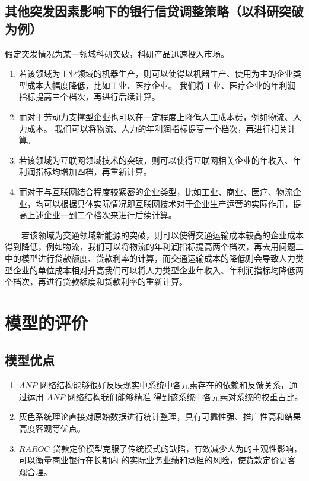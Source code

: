 \documentclass[withoutpreface,bwprint]{cumcmthesis}
\begin{document}
    \subsection{其他突发因素影响下的银行信贷调整策略（以科研突破为例）}
    假定突发情况为某一领域科研突破，科研产品迅速投入市场。
        \begin{enumerate}
            \item 若该领域为工业领域的机器生产，则可以使得以机器生产、使用为主的企业类型成本大幅度降低，比如工业、医疗企业。
                我们将工业、医疗企业的年利润指标提高三个档次，再进行后续计算。
            \item 而对于劳动力支撑型企业也可以在一定程度上降低人工成本费，例如物流、人力成本。
                我们可以将物流、人力的年利润指标提高一个档次，再进行相关计算。
            \item 若该领域为互联网领域技术的突破，则可以使得互联网相关企业的年收入、年利润指标均增加四档，再重新计算。
            \item 而对于与互联网结合程度较紧密的企业类型，比如工业、商业、医疗、物流企业，均可以根据具体实际情况即互联网技术对于企业生产运营的实际作用，提高上述企业一到二个档次来进行后续计算。
        \end{enumerate}
    若该领域为交通领域新能源的突破，则可以使得交通运输成本较高的企业成本得到降低，例如物流，我们可以将物流的年利润指标提高两个档次，再去用问题二中的模型进行贷款额度、贷款利率的计算，而交通运输成本的降低则会导致人力类型企业的单位成本相对升高我们可以将人力类型企业年收入、年利润指标均降低两个档次，再进行贷款额度和贷款利率的重新计算。
    
    \section{模型的评价}
    \subsection{模型优点}
    \begin{enumerate}
        \item $ANP$ 网络结构能够很好反映现实中系统中各元素存在的依赖和反馈关系，通过运用 $ANP$ 网络结构我们能够精准
                得到该系统中各元素对系统的权重占比。
        \item 灰色系统理论直接对原始数据进行统计整理，具有可靠性强、推广性高和结果高度客观等优点。        
        \item $RAROC$ 贷款定价模型克服了传统模式的缺陷，有效减少人为的主观性影响，可以衡量商业银行在长期内
             的实际业务业绩和承担的风险，使货款定价更客观合理。
    \end{enumerate}
\end{document}
